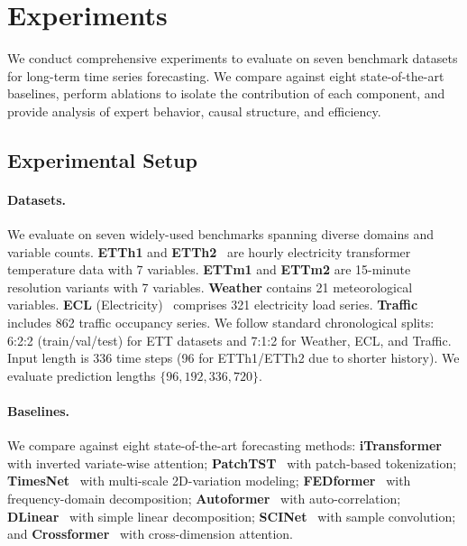 \section{Experiments}

We conduct comprehensive experiments to evaluate \model on seven benchmark datasets for long-term time series forecasting. We compare against eight state-of-the-art baselines, perform ablations to isolate the contribution of each component, and provide analysis of expert behavior, causal structure, and efficiency.

\subsection{Experimental Setup}

\paragraph{Datasets.}
We evaluate on seven widely-used benchmarks spanning diverse domains and variable counts. \textbf{ETTh1} and \textbf{ETTh2}~\cite{zhou2021informer} are hourly electricity transformer temperature data with 7 variables. \textbf{ETTm1} and \textbf{ETTm2} are 15-minute resolution variants with 7 variables. \textbf{Weather} contains 21 meteorological variables. \textbf{ECL} (Electricity)~\cite{wu2021autoformer} comprises 321 electricity load series. \textbf{Traffic}~\cite{wu2021autoformer} includes 862 traffic occupancy series. We follow standard chronological splits: 6:2:2 (train/val/test) for ETT datasets and 7:1:2 for Weather, ECL, and Traffic. Input length is 336 time steps (96 for ETTh1/ETTh2 due to shorter history). We evaluate prediction lengths $\{96, 192, 336, 720\}$.

\paragraph{Baselines.}
We compare against eight state-of-the-art forecasting methods: \textbf{iTransformer}~\cite{liu2024itransformer} with inverted variate-wise attention; \textbf{PatchTST}~\cite{nie2023patchtst} with patch-based tokenization; \textbf{TimesNet}~\cite{wu2023timesnet} with multi-scale 2D-variation modeling; \textbf{FEDformer}~\cite{zhou2022fedformer} with frequency-domain decomposition; \textbf{Autoformer}~\cite{wu2021autoformer} with auto-correlation; \textbf{DLinear}~\cite{zeng2023dlinear} with simple linear decomposition; \textbf{SCINet}~\cite{liu2022scinet} with sample convolution; and \textbf{Crossformer}~\cite{zhang2023crossformer} with cross-dimension attention.


